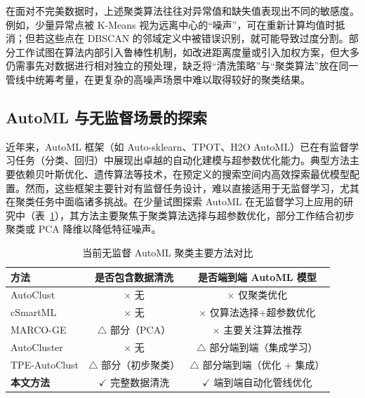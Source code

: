 \documentclass[10pt]{article} %
\numberwithin{equation}{section}
\begin{document}
在面对不完美数据时，上述聚类算法往往对异常值和缺失值表现出不同的敏感度。例如，少量异常点被 K-Means 视为远离中心的“噪声”，可在重新计算均值时抵消\cite{Atif2024}；但若这些点在 DBSCAN 的邻域定义中被错误识别，就可能导致过度分割\cite{Guo2024}。部分工作试图在算法内部引入鲁棒性机制，如改进距离度量或引入加权方案\cite{8896034}，但大多仍需事先对数据进行相对独立的预处理，缺乏将“清洗策略”与“聚类算法”放在同一管线中统筹考量，在更复杂的高噪声场景中难以取得较好的聚类结果。

\subsection{AutoML 与无监督场景的探索}

近年来，AutoML 框架（如 Auto-sklearn\cite{10.5555/3586589.3586850}、TPOT\cite{Olson2019, Romano2021}、H2O AutoML）已在有监督学习任务（分类、回归）中展现出卓越的自动化建模与超参数优化能力。典型方法主要依赖贝叶斯优化、遗传算法\cite{10.1145/3674029.3674058}等技术，在预定义的搜索空间内高效探索最优模型配置。然而，这些框架主要针对有监督任务设计，难以直接适用于无监督学习，尤其在聚类任务中面临诸多挑战\cite{10.1145/3643564}。在少量试图探索 AutoML 在无监督学习上应用的研究中（表~\ref{tab:aml_clustering_summary}），其方法主要聚焦于聚类算法选择与超参数优化，部分工作结合初步聚类或 PCA 降维以降低特征噪声。

\begin{table}[t]
\centering
\small
\begin{tabular}{lcc}
\toprule
\textbf{方法} & \textbf{是否包含数据清洗} & \textbf{是否端到端 AutoML 模型} \\
\midrule
AutoClust\cite{9338346}          & $\times$ 无                  & $\times$ 仅聚类优化 \\
cSmartML\cite{9671542}           & $\times$ 无                  & $\times$ 仅算法选择+超参数优化 \\
MARCO-GE\cite{10031201}          & $\triangle$ 部分（PCA）      & $\times$ 主要关注算法推荐 \\
AutoCluster\cite{10.1007/978-3-030-75768-720} &
                                  $\times$ 无                  & $\triangle$ 部分端到端（集成学习） \\
TPE-AutoClust\cite{10031132}     & $\triangle$ 部分（初步聚类） & $\triangle$ 部分端到端（优化 + 集成） \\
\textbf{本文方法}                & $\checkmark$ 完整数据清洗   & $\checkmark$ 端到端自动化管线优化 \\
\bottomrule
\end{tabular}
\caption{当前无监督 AutoML 聚类主要方法对比}
\label{tab:aml_clustering_summary}
\end{table}
\end{document}
